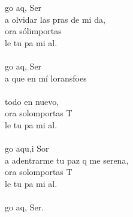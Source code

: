\begin{cancion}%
	go aq,  Ser \\
	a olvidar las pras de mi da,\\
	ora sólimportas \\
	le tu pa mi al.\\
	\jump\\
	go aq,  Ser \\
	a que en mí loransfoes \\
	\jump\\
todo en nuevo,\\
	ora solomportas T\\
	le tu pa mi al.\\
	\jump\\
	go aqu,i Sor\\
	a adentrarme  tu paz q me serena,\\
	ora solomportas T\\
	le tu pa mi al.\\
	\jump\\
	go aq,  Ser. \\
\end{cancion}%
